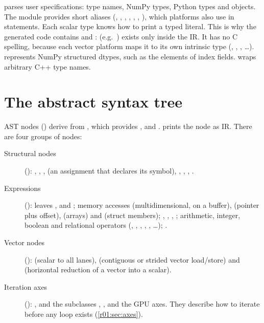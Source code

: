  parses user specifications: type names, NumPy types, Python types
and  objects. The module  provides short aliases
(, , , , ,
, ), which platforms also use in
 statements.
Each scalar type knows how to print a typed literal. This is why the generated code
contains  and :
 (e.g.\ ) exists only inside the IR. It has no C
spelling, because each vector platform maps it to its own intrinsic type
(, , , \dots). 
represents NumPy structured dtypes, such as the elements of index fields.
 wraps arbitrary C++ type names.

\section{The abstract syntax tree}\label{r01:sec:ast}

AST nodes () derive from , which provides
,  and .  prints
the node as IR. There are four groups of nodes:

\begin{description}
  \item[Structural nodes] (): , ,
    ,  (an assignment that declares its symbol),
    , , , .
  \item[Expressions] (): leaves ,
     and ; memory accesses 
    (multidimensional, on a buffer),  (pointer plus offset),
     (arrays) and  (struct members); ,
    , , ; arithmetic, integer, boolean and
    relational operators (, , , ,
    , \dots); .
  \item[Vector nodes] ():  (scalar to all lanes),
     (contiguous or strided vector load/store) and
     (horizontal reduction of a vector into a scalar).
  \item[Iteration axes] (): ,  and the
     subclasses , ,
     and the GPU axes. They describe how to iterate before any loop
    exists (\cref{r01:sec:axes}).
\end{description}

